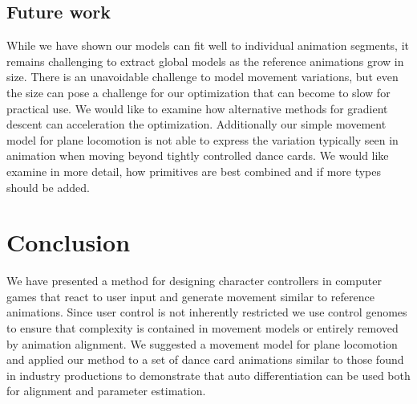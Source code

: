 \subsection{Future work}
While we have shown our models can fit well to individual animation segments, it remains challenging to extract global models as the reference animations grow in size. There is an unavoidable challenge to model movement variations, but even the size can pose a challenge for our optimization that can become to slow for practical use. We would like to examine how alternative methods for gradient descent can acceleration the optimization. 
Additionally our simple movement model for plane locomotion is not able to express the variation typically seen in animation when moving beyond tightly controlled dance cards. We would like examine in more detail, how primitives are best combined and if more types should be added.

\section{Conclusion}
We have presented a method for designing character controllers in computer games that react to user input and generate movement similar to reference animations. Since user control is not inherently restricted we use control genomes to ensure that complexity is contained in movement models or entirely removed by animation alignment. We suggested a movement model for plane locomotion and applied our method to a set of dance card animations similar to those found in industry productions to demonstrate that auto differentiation can be used both for alignment and parameter estimation.  



